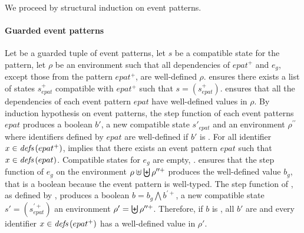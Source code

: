 \begin{skippableproof}
    We proceed by structural induction on event patterns.

    \paragraph{Guarded event patterns}
    Let  be a guarded tuple of event patterns, let $s$ be a compatible state
    for the pattern, let $\rho$ be an environment such that all dependencies of $epat^+$ and $e_g$,
    except those from the pattern $epat^+$, are well-defined $\rho$.
     ensures there exists a list of states $s_{epat}^+$
    compatible with $epat^+$ such that $s = (s_{epat}^+)$.
     ensures that all the dependencies
    of each event pattern $epat$ have well-defined values in $\rho$. By induction hypothesis on
    event patterns, the step function of each event patterns $epat$ produces a boolean $b'$, a new
    compatible state $s'_{epat}$ and an environment $\rho^{\prime\prime}$ where identifiers defined
    by $epat$ are well-defined if $b'$ is \true.
    For all identifier $x \in {\ensuremath{\textit{defs}\left(epat^+\right)}}$, 
    implies that there exists an event pattern $epat$ such that $x \in {\ensuremath{\textit{defs}\left(epat\right)}}$.
    Compatible states for $e_g$ are empty, \cf {}.
     ensures that the step function of $e_g$ on
    the environment $\rho \uplus \biguplus \rho^{\prime\prime+}$ produces the well-defined value
    $b_g$, that is a boolean because the event pattern is well-typed.
    The step function of , as defined by
    , produces a boolean
    $b = b_g \bigwedge b^{\prime+}$, a new compatible
    state $s' = (s_{epat}^{\prime+})$ an environment $\rho' = \biguplus \rho^{\prime\prime+}$.
    Therefore, if $b$ is \true, all $b'$ are \true and every identifier $x \in
        {\ensuremath{\textit{defs}\left(epat^+\right)}}$ has a well-defined value in $\rho'$.


\end{skippableproof}
